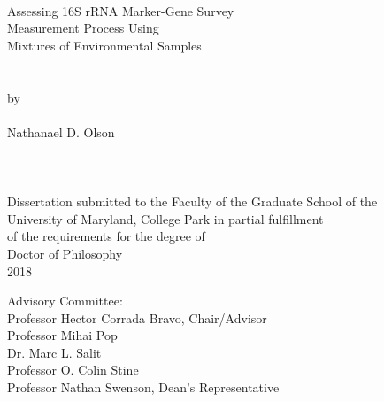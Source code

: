 
\thispagestyle{empty}
\hbox{\ }
\vspace{1in}
\renewcommand{\baselinestretch}{1}
\small\normalsize
\begin{center}

\large{Assessing 16S rRNA Marker-Gene Survey}\\
\large{Measurement Process Using} \\
\large{Mixtures of Environmental Samples} \\
\ \\
\ \\
\large{by} \\
\ \\
\large{Nathanael D. Olson}%
\ \\
\ \\
\ \\
\ \\
\normalsize
Dissertation submitted to the Faculty of the Graduate School of the \\
University of Maryland, College Park in partial fulfillment \\
of the requirements for the degree of \\
Doctor of Philosophy \\
2018
\end{center}

\vspace{7.5em}

\noindent Advisory Committee: \\
Professor Hector Corrada Bravo, Chair/Advisor \\
Professor Mihai Pop \\
Dr. Marc L. Salit \\
Professor O. Colin Stine \\
Professor Nathan Swenson, Dean's Representative
